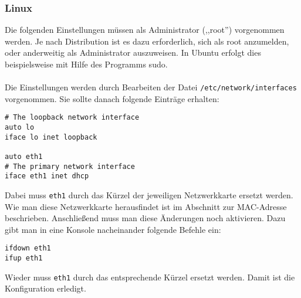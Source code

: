 \documentclass[12pt,titlepage,twoside]{scrartcl}
\begin{document}
\subsubsection{Linux}
Die folgenden Einstellungen müssen als Administrator (,,root'') vorgenommen
werden. Je nach Distribution ist es dazu erforderlich, sich als root
anzumelden, oder anderweitig als Administrator auszuweisen. In Ubuntu
erfolgt dies beispielsweise mit Hilfe des Programms sudo.\\\\
Die Einstellungen werden durch Bearbeiten der Datei
\texttt{/etc/network/interfaces} vorgenommen. Sie sollte danach
folgende Einträge erhalten:
\begin{verbatim}
# The loopback network interface
auto lo 
iface lo inet loopback

auto eth1
# The primary network interface
iface eth1 inet dhcp 

\end{verbatim}
Dabei muss \texttt{eth1} durch das Kürzel der jeweiligen Netzwerkkarte
ersetzt werden. Wie man diese Netzwerkkarte herausfindet ist im
Abschnitt zur MAC-Adresse beschrieben. Anschließend muss man diese
Änderungen noch aktivieren. Dazu gibt man in eine Konsole nacheinander
folgende Befehle ein:
\begin{verbatim}
ifdown eth1
ifup eth1
\end{verbatim}
Wieder muss \texttt{eth1} durch das entsprechende Kürzel ersetzt
werden. Damit ist die Konfiguration erledigt.
\end{document}
